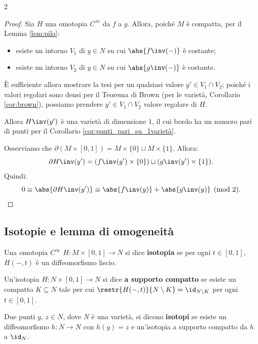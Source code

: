 \begin{multicols*}{2}
    \begin{proof}
        Sia $H$ una omotopia $C^\infty$ da $f$ a $g$. Allora, poiché $M$ è compatta,
        per il Lemma \ref{lem:pila}:
        \begin{itemize}
            \item esiste un intorno $V_1$ di $y \in N$ su cui $\abs{f\inv(-)}$ è costante;
            \item esiste un intorno $V_2$ di $y \in N$ su cui $\abs{g\inv(-)}$ è costante.
        \end{itemize}
        È sufficiente allora mostrare la tesi per un qualsiasi valore $y' \in V_1 \cap V_2$;
        poiché i valori regolari sono densi per il Teorema di Brown (per le varietà, Corollario \ref{cor:brown}),
        possiamo prendere $y' \in V_1 \cap V_2$ valore regolare di $H$. \smallskip

        Allora $H\inv(y')$ è una varietà di dimensione $1$, il cui bordo ha un numero pari
        di punti per il Corollario \ref{cor:punti_pari_su_1varietà}. \smallskip

        Osserviamo che $\partial (M \times [0, 1]) = M \times \{0\} \sqcup M \times \{1\}$. Allora:
        \[
            \partial H\inv(y') = (f\inv(y') \times \{0\}) \sqcup (g\inv(y') \times \{1\}).
        \]
        Quindi:
        \[
            0 \equiv \abs{\partial H\inv(y')} \equiv \abs{f\inv(y)} + \abs{g\inv(y)} \pmod{2}.
        \]
    \end{proof}

    \subsection{Isotopie e lemma di omogeneità}

    \begin{definition}[Isotopia]
        Una omotopia $C^\infty$ $H : M \times [0, 1] \to N$ si dice
        \textbf{isotopia} se per ogni $t \in [0, 1]$, $H(-, t)$ è un
        diffeomorfismo liscio.
    \end{definition}

    \begin{definition}
        Un'isotopia $H : N \times [0, 1] \to N$ si dice \textbf{a supporto compatto} se esiste
        un compatto $K \subseteq N$ tale per cui $\restr{H(-, t)}{N \setminus K} = \id_{N \setminus K}$
        per ogni $t \in [0, 1]$.
    \end{definition}

    \begin{definition}
        Due punti $y$, $z \in N$, dove $N$ è una varietà, si dicono
        \textbf{isotopi} se esiste un diffeomorfismo $h : N \to N$
        con $h(y) = z$ e un'isotopia a supporto compatto da $h$ a
        $\id_{N}$.
    \end{definition}


\end{multicols*}
